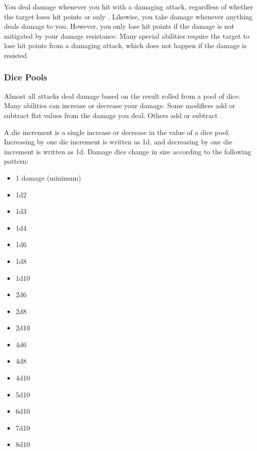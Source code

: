         You deal damage whenever you hit with a damaging attack, regardless of whether the target loses hit points or only .
        Likewise, you take damage whenever anything deals damage to you.
        However, you only lose hit points if the damage is not mitigated by your damage resistance.
        Many special abilities require the target to lose hit points from a damaging attack, which does not happen if the damage is resisted.

        \subsubsection{Dice Pools}\label{Dice Pools}
            Almost all attacks deal damage based on the result rolled from a pool of dice.
            Many abilities can increase or decrease your damage.
            Some modifiers add or subtract flat values from the damage you deal.
            Others add or subtract .

            A die increment is a single increase or decrease in the value of a dice pool.
            Increasing by one die increment is written as \plus1d, and decreasing by one die increment is written as \minus1d.
            Damage dice change in size according to the following pattern:
            \begin{itemize}
                \item 1 damage (minimum)
                \item 1d2
                \item 1d3
                \item 1d4
                \item 1d6
                \item 1d8
                \item 1d10
                \item 2d6
                \item 2d8
                \item 2d10
                \item 4d6
                \item 4d8
                \item 4d10
                \item 5d10
                \item 6d10
                \item 7d10
                \item 8d10
            \end{itemize}

